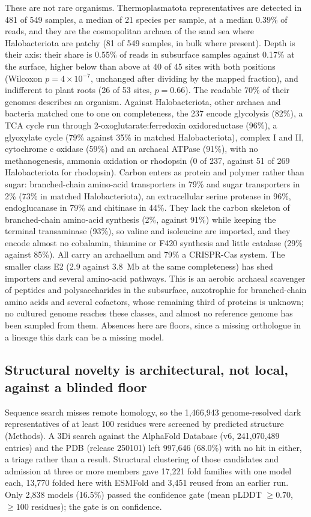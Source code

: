 \documentclass[11pt]{article}
\begin{document}
These are not rare organisms. Thermoplasmatota representatives are detected in 481 of 549 samples,
a median of 21 species per sample, at a median 0.39\% of reads, and they are the cosmopolitan archaea
of the sand sea where Halobacteriota are patchy (81 of 549 samples, in bulk where present). Depth is
their axis: their share is 0.55\% of reads in subsurface samples against 0.17\% at the surface, higher
below than above at 40 of 45 sites with both positions (Wilcoxon $p = 4 \times 10^{-7}$, unchanged
after dividing by the mapped fraction), and indifferent to plant roots (26 of 53 sites, $p = 0.66$).
The readable 70\% of their genomes describes an organism. Against Halobacteriota, other archaea and
bacteria matched one to one on completeness, the 237 encode glycolysis (82\%), a TCA cycle run through
2-oxoglutarate:ferredoxin oxidoreductase (96\%), a glyoxylate cycle (79\% against 35\% in matched
Halobacteriota), complex I and II, cytochrome c oxidase (59\%) and an archaeal ATPase (91\%), with no
methanogenesis, ammonia oxidation or rhodopsin (0 of 237, against 51 of 269 Halobacteriota for
rhodopsin). Carbon enters as protein and polymer rather than sugar: branched-chain amino-acid
transporters in 79\% and sugar transporters in 2\% (73\% in matched Halobacteriota), an extracellular
serine protease in 96\%, endoglucanase in 79\% and chitinase in 44\%. They lack the carbon skeleton of
branched-chain amino-acid synthesis (2\%, against 91\%) while keeping the terminal transaminase
(93\%), so valine and isoleucine are imported, and they encode almost no cobalamin, thiamine or F420
synthesis and little catalase (29\% against 85\%). All carry an archaellum and 79\% a CRISPR-Cas
system. The smaller class E2 (2.9 against 3.8~Mb at the same completeness) has shed importers and
several amino-acid pathways. This is an aerobic archaeal scavenger of peptides and polysaccharides
in the subsurface, auxotrophic for branched-chain amino acids and several cofactors, whose remaining
third of proteins is unknown; no cultured genome reaches these classes, and almost no reference
genome has been sampled from them. Absences here are floors, since a missing orthologue in a lineage
this dark can be a missing model.

\subsection*{Structural novelty is architectural, not local, against a blinded floor}

Sequence search misses remote homology, so the 1{,}466{,}943 genome-resolved dark representatives
of at least 100 residues were screened by predicted structure (Methods). A 3Di search against the
AlphaFold Database (v6, 241{,}070{,}489 entries) and the PDB (release 250101) left 997{,}646
(68.0\%) with no hit in either, a triage rather than a result. Structural clustering of those
candidates and admission at three or more members gave 17{,}221 fold families with one model each,
13{,}770 folded here with ESMFold and 3{,}451 reused from an earlier run. Only 2{,}838 models
(16.5\%) passed the confidence gate (mean pLDDT $\geq 0.70$, $\geq 100$ residues); the gate is on
confidence.
\end{document}
